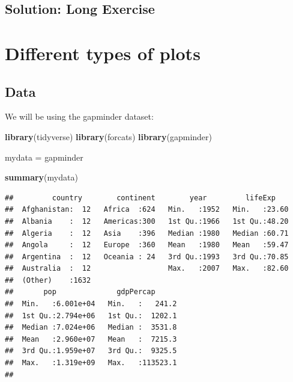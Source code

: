 \documentclass[]{book}
\makeatletter
\newenvironment{Shaded}{\begin{snugshade}}{\end{snugshade}}
\newcommand{\KeywordTok}[1]{\textcolor[rgb]{0.13,0.29,0.53}{\textbf{#1}}}
\newcommand{\DataTypeTok}[1]{\textcolor[rgb]{0.13,0.29,0.53}{#1}}
\newcommand{\DecValTok}[1]{\textcolor[rgb]{0.00,0.00,0.81}{#1}}
\newcommand{\StringTok}[1]{\textcolor[rgb]{0.31,0.60,0.02}{#1}}
\newcommand{\OperatorTok}[1]{\textcolor[rgb]{0.81,0.36,0.00}{\textbf{#1}}}
\newcommand{\NormalTok}[1]{#1}
\newenvironment{kframe}{%
\medskip{}
\setlength{\fboxsep}{.8em}
 \def\at@end@of@kframe{}%
 \ifinner\ifhmode%
  \def\at@end@of@kframe{\end{minipage}}%
  \begin{minipage}{\columnwidth}%
 \fi\fi%
 \def\FrameCommand##1{\hskip\@totalleftmargin \hskip-\fboxsep
 \colorbox{shadecolor}{##1}\hskip-\fboxsep
     \hskip-\linewidth \hskip-\@totalleftmargin \hskip\columnwidth}%
 \MakeFramed {\advance\hsize-\width
   \@totalleftmargin\z@ \linewidth\hsize
   \@setminipage}}%
 {\par\unskip\endMakeFramed%
 \at@end@of@kframe}
\renewenvironment{Shaded}{\begin{kframe}}{\end{kframe}}
\makeatother
\begin{document}
\section{Solution: Long Exercise}\label{solution-long-exercise}

\begin{Shaded}
\end{Shaded}

\chapter{Different types of plots}\label{different-types-of-plots}

\section{Data}\label{data-2}

We will be using the gapminder dataset:

\begin{Shaded}
\begin{Highlighting}[]
\KeywordTok{library}\NormalTok{(tidyverse)}
\KeywordTok{library}\NormalTok{(forcats)}
\KeywordTok{library}\NormalTok{(gapminder)}

\NormalTok{mydata =}\StringTok{ }\NormalTok{gapminder}

\KeywordTok{summary}\NormalTok{(mydata)}
\end{Highlighting}
\end{Shaded}

\begin{verbatim}
##         country        continent        year         lifeExp     
##  Afghanistan:  12   Africa  :624   Min.   :1952   Min.   :23.60  
##  Albania    :  12   Americas:300   1st Qu.:1966   1st Qu.:48.20  
##  Algeria    :  12   Asia    :396   Median :1980   Median :60.71  
##  Angola     :  12   Europe  :360   Mean   :1980   Mean   :59.47  
##  Argentina  :  12   Oceania : 24   3rd Qu.:1993   3rd Qu.:70.85  
##  Australia  :  12                  Max.   :2007   Max.   :82.60  
##  (Other)    :1632                                                
##       pop              gdpPercap       
##  Min.   :6.001e+04   Min.   :   241.2  
##  1st Qu.:2.794e+06   1st Qu.:  1202.1  
##  Median :7.024e+06   Median :  3531.8  
##  Mean   :2.960e+07   Mean   :  7215.3  
##  3rd Qu.:1.959e+07   3rd Qu.:  9325.5  
##  Max.   :1.319e+09   Max.   :113523.1  
## 
\end{verbatim}
\end{document}
